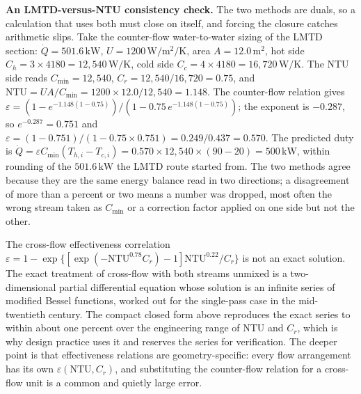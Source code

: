 \textbf{An LMTD-versus-NTU consistency check.} The two methods are duals, so a
calculation that uses both must close on itself, and forcing the closure catches
arithmetic slips. Take the counter-flow water-to-water sizing of the LMTD
section: $\dot{Q} = 501.6\,\text{kW}$, $U = 1200\,\si{\watt\per\meter\squared
\per\kelvin}$, area $A = 12.0\,\text{m}^2$, hot side $C_h = 3\times 4180 =
12{,}540\,\si{\watt\per\kelvin}$, cold side $C_c = 4\times 4180 = 16{,}720\,
\si{\watt\per\kelvin}$. The NTU side reads $C_{\min} = 12{,}540$, $C_r = 12{,}540
/16{,}720 = 0.75$, and $\text{NTU} = UA/C_{\min} = 1200\times 12.0/12{,}540 =
1.148$. The counter-flow relation gives $\varepsilon = (1 - e^{-1.148(1 -
0.75)})/(1 - 0.75\,e^{-1.148(1 - 0.75)})$; the exponent is $-0.287$, so $e^{-
0.287} = 0.751$ and $\varepsilon = (1 - 0.751)/(1 - 0.75\times 0.751) = 0.249/
0.437 = 0.570$. The predicted duty is $\dot{Q} = \varepsilon C_{\min}(T_{h,i} -
T_{c,i}) = 0.570\times 12{,}540\times (90 - 20) = 500\,\text{kW}$, within
rounding of the $501.6\,\text{kW}$ the LMTD route started from. The two methods
agree because they are the same energy balance read in two directions; a
disagreement of more than a percent or two means a number was dropped, most
often the wrong stream taken as $C_{\min}$ or a correction factor applied on one
side but not the other.

\begin{mastery}
The cross-flow effectiveness correlation
$\varepsilon = 1 - \exp\{[\exp(-\text{NTU}^{0.78} C_r) - 1]
\text{NTU}^{0.22}/C_r\}$ is not an exact solution. The exact treatment
of cross-flow with both streams unmixed is a two-dimensional partial
differential equation whose solution is an infinite series of modified
Bessel functions, worked out for the single-pass case in the
mid-twentieth century. The compact closed form above reproduces the
exact series to within about one percent over the engineering range of
NTU and $C_r$, which is why design practice uses it and reserves the
series for verification. The deeper point is that effectiveness
relations are geometry-specific: every flow arrangement has its own
$\varepsilon(\text{NTU}, C_r)$, and substituting the counter-flow
relation for a cross-flow unit is a common and quietly large error.
\end{mastery}

